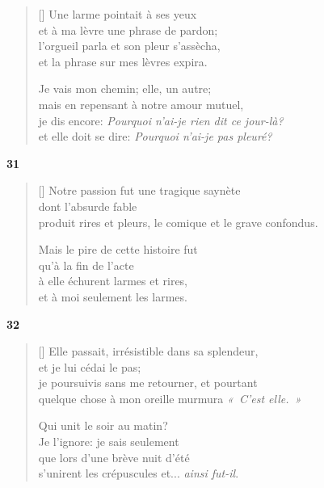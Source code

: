 \documentclass[a4paper,12pt]{book}
\begin{document}

\begin{verse}[\versewidth]
  Une larme pointait à ses yeux \\
  et à ma lèvre une phrase de pardon; \\
  l'orgueil parla et son pleur s'assècha, \\
  et la phrase sur mes lèvres expira.

  Je vais mon chemin; elle, un autre; \\
  mais en repensant à notre amour mutuel, \\
  je dis encore: \emph{Pourquoi n'ai-je rien dit ce jour-là?} \\
  et elle doit se dire: \emph{Pourquoi n'ai-je pas pleuré?}
\end{verse}

\bigskip

\begin{center}
  \textbf{31}
\end{center}

\settowidth{\versewidth}{Notre passion fut une tragique saynète}

\begin{verse}[\versewidth]
  Notre passion fut une tragique saynète \\
  dont l'absurde fable \\
  produit rires et pleurs,
  le comique et le grave confondus.

  Mais le pire de cette histoire fut \\
  qu'à la fin de l'acte \\
  à elle échurent larmes et rires, \\
  et à moi seulement les larmes.
\end{verse}

\bigskip

\begin{center}
  \textbf{32}
\end{center}

\settowidth{\versewidth}{je poursuivis sans me retourner, et pourtant}

\begin{verse}[\versewidth]
  Elle passait, irrésistible dans sa splendeur, \\
  et je lui cédai le pas; \\
  je poursuivis sans me retourner, et pourtant \\
  quelque chose à mon oreille murmura \emph{«~C'est elle.~»}

  Qui unit le soir au matin? \\
  Je l'ignore: je sais seulement \\
  que lors d'une brève nuit d'été \\
  s'unirent les crépuscules et... \emph{ainsi fut-il}.
\end{verse}
\end{document}
